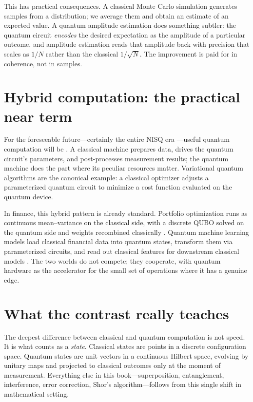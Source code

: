 This has practical consequences. A classical Monte Carlo simulation generates samples from a distribution; we average them and obtain an estimate of an expected value. A quantum amplitude estimation does something subtler: the quantum circuit \emph{encodes} the desired expectation as the amplitude of a particular outcome, and amplitude estimation reads that amplitude back with precision that scales as $1/N$ rather than the classical $1/\sqrt{N}$. The improvement is paid for in coherence, not in samples.

\section{Hybrid computation: the practical near term}

For the foreseeable future---certainly the entire NISQ era \citep{preskill_quantum_2018}---useful quantum computation will be . A classical machine prepares data, drives the quantum circuit's parameters, and post-processes measurement results; the quantum machine does the part where its peculiar resources matter. Variational quantum algorithms \citep{cerezo_variational_2021} are the canonical example: a classical optimizer adjusts a parameterized quantum circuit to minimize a cost function evaluated on the quantum device.

In finance, this hybrid pattern is already standard. Portfolio optimization runs as continuous mean--variance on the classical side, with a discrete QUBO solved on the quantum side and weights recombined classically \citep{morapakula_end--end_2026}. Quantum machine learning models load classical financial data into quantum states, transform them via parameterized circuits, and read out classical features for downstream classical models \citep{ciceri_enhanced_2025}. The two worlds do not compete; they cooperate, with quantum hardware as the accelerator for the small set of operations where it has a genuine edge.

\section{What the contrast really teaches}

The deepest difference between classical and quantum computation is not speed. It is what counts as a \emph{state}. Classical states are points in a discrete configuration space. Quantum states are unit vectors in a continuous Hilbert space, evolving by unitary maps and projected to classical outcomes only at the moment of measurement. Everything else in this book---superposition, entanglement, interference, error correction, Shor's algorithm---follows from this single shift in mathematical setting.

